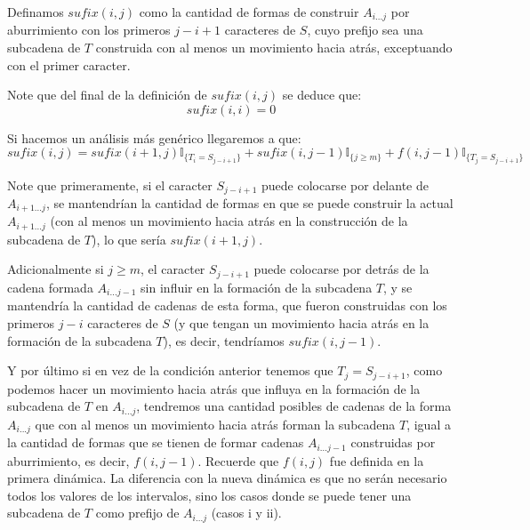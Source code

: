 \documentclass[a4paper]{article}
\begin{document}

    

    
    
    
    Definamos $sufix(i,j)$ como la cantidad de formas de construir $A_{i...j}$ por aburrimiento con los primeros $j-i+1$ caracteres de $S$, cuyo prefijo sea una subcadena de $T$ construida con al menos un movimiento hacia atrás, exceptuando con el primer caracter.
    
    Note que del final de la definición de $sufix(i,j)$ se deduce que:
    $$sufix(i,i) = 0$$
    
    Si hacemos un análisis más genérico llegaremos a que:
    $$sufix(i,j) = sufix(i+1,j)\mathbb{I}_{ \{ T_i = S_{j-i+1} \}} + 
    sufix(i, j-1) \mathbb{I}_{ \{ j \ge m \}} + 
    f(i, j-1) \mathbb{I}_{ \{ T_j = S_{j-i+1}\}}$$
    
    Note que primeramente, si el caracter $S_{j-i+1}$ puede colocarse por delante de $A_{i+1...j}$, se mantendrían la cantidad de formas en que se puede construir la actual $A_{i+1...j}$ (con al menos un movimiento hacia atrás en la construcción de la subcadena de $T$), lo que sería $sufix(i+1,j)$.
    
    Adicionalmente si $j \ge m$, el caracter $S_{j-i+1}$ puede colocarse por detrás de la cadena formada $A_{i...j-1}$ sin influir en la formación de la subcadena $T$, y se mantendría la cantidad de cadenas de esta forma, que fueron construidas con los primeros $j-i$ caracteres de $S$ (y que tengan un movimiento hacia atrás en la formación de la subcadena $T$), es decir, tendríamos $sufix(i, j-1)$.
    
    Y por último si en vez de la condición anterior tenemos que $T_j = S_{j-i+1}$, como podemos hacer un movimiento hacia atrás que influya en la formación de la subcadena de $T$ en $A_{i...j}$, tendremos una cantidad posibles de cadenas de la forma $A_{i...j}$ que con al menos un movimiento hacia atrás forman la subcadena $T$, igual a la cantidad de formas que se tienen de formar cadenas $A_{i...j-1}$ construidas por aburrimiento, es decir, $f(i,j-1)$. Recuerde que $f(i,j)$ fue definida en la primera dinámica. La diferencia con la nueva dinámica es que no serán necesario todos los valores de los intervalos, sino los casos donde se puede tener una subcadena de $T$ como prefijo de $A_{i...j}$ (casos i y ii).
    
\end{document}
